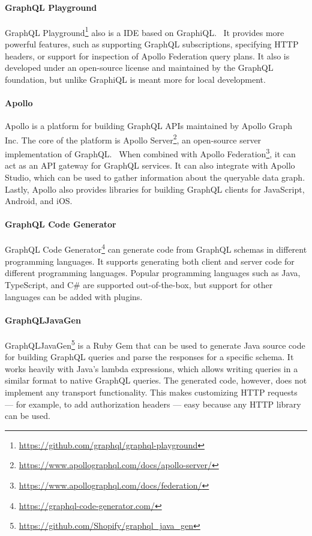 \paragraph{GraphQL Playground}

GraphQL Playground\footnote{\url{https://github.com/graphql/graphql-playground}} also is a \ac{IDE} based on GraphiQL.~%
It provides more powerful features, such as supporting GraphQL subscriptions, specifying \ac{HTTP} headers, or support for inspection of Apollo Federation query plans.
It also is developed under an open-source license and maintained by the GraphQL foundation, but unlike GraphiQL is meant more for local development.

\paragraph{Apollo}

Apollo is a platform for building GraphQL \acp{API} maintained by Apollo Graph Inc.
The core of the platform is Apollo Server\footnote{\url{https://www.apollographql.com/docs/apollo-server/}}, an open-source server implementation of GraphQL.~%
When combined with Apollo Federation\footnote{\url{https://www.apollographql.com/docs/federation/}}, it can act as an \ac{API} gateway for GraphQL services.
It can also integrate with Apollo Studio, which can be used to gather information about the queryable data graph.
Lastly, Apollo also provides libraries for building GraphQL clients for JavaScript, Android, and iOS.%

\paragraph{GraphQL Code Generator}

GraphQL Code Generator\footnote{\url{https://graphql-code-generator.com/}} can generate code from GraphQL schemas in different programming languages.
It supports generating both client and server code for different programming languages.
Popular programming languages such as Java, TypeScript, and C\# are supported out-of-the-box, but support for other languages can be added with plugins.

\paragraph{GraphQLJavaGen}

GraphQLJavaGen\footnote{\url{https://github.com/Shopify/graphql_java_gen}} is a Ruby Gem that can be used to generate Java source code for building GraphQL queries and parse the responses for a specific schema.
It works heavily with Java's lambda expressions, which allows writing queries in a similar format to native GraphQL queries.
The generated code, however, does not implement any transport functionality.
This makes customizing \ac{HTTP} requests --- for example, to add authorization headers --- easy because any \ac{HTTP} library can be used.